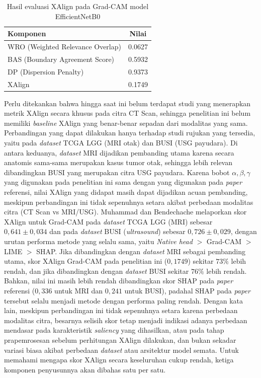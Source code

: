 \begin{table}[htbp]
	\centering
	\caption{Hasil evaluasi XAlign pada Grad-CAM model EfficientNetB0}
	\label{tab:xalign-hasil}
	\begin{tabular}{|l|c|}
		\hline
		\textbf{Komponen} & \textbf{Nilai} \\ \hline
		WRO (Weighted Relevance Overlap) & 0.0627 \\ \hline
		BAS (Boundary Agreement Score)   & 0.5932 \\ \hline
		DP (Dispersion Penalty)          & 0.9373 \\ \hline
		XAlign                  & 0.1749 \\ \hline
	\end{tabular}
\end{table}

Perlu ditekankan bahwa hingga saat ini belum terdapat studi yang menerapkan metrik XAlign secara khusus pada citra CT Scan, sehingga penelitian ini belum memiliki \textit{baseline} XAlign yang benar-benar sepadan dari modalitas yang sama. Perbandingan yang dapat dilakukan hanya terhadap studi rujukan yang tersedia, yaitu pada \textit{dataset} TCGA LGG (MRI otak) dan BUSI (USG payudara). Di antara keduanya, \textit{dataset} MRI dijadikan pembanding utama karena secara anatomis sama-sama merupakan kasus tumor otak, sehingga lebih relevan dibandingkan BUSI yang merupakan citra USG payudara. Karena bobot $\alpha, \beta, \gamma$ yang digunakan pada penelitian ini sama dengan yang digunakan pada \textit{paper} referensi, nilai XAlign yang didapat masih dapat dijadikan acuan pembanding, meskipun perbandingan ini tidak sepenuhnya setara akibat perbedaan modalitas citra (CT Scan vs MRI/USG). Muhammad dan Bendechache \cite{muhammad2025heatmap} melaporkan skor XAlign untuk Grad-CAM pada \textit{dataset} TCGA LGG (MRI) sebesar $0,641 \pm 0,034$ dan pada \textit{dataset} BUSI (\textit{ultrasound}) sebesar $0,726 \pm 0,029$, dengan urutan performa metode yang selalu sama, yaitu \textit{Native head} $>$ Grad-CAM $>$ LIME $>$ SHAP. Jika dibandingkan dengan \textit{dataset} MRI sebagai pembanding utama, skor XAlign Grad-CAM pada penelitian ini ($0,1749$) sekitar $73\%$ lebih rendah, dan jika dibandingkan dengan \textit{dataset} BUSI sekitar $76\%$ lebih rendah. Bahkan, nilai ini masih lebih rendah dibandingkan skor SHAP pada \textit{paper} referensi ($0,336$ untuk MRI dan $0,241$ untuk BUSI), padahal SHAP pada \textit{paper} tersebut selalu menjadi metode dengan performa paling rendah. Dengan kata lain, meskipun perbandingan ini tidak sepenuhnya setara karena perbedaan modalitas citra, besarnya selisih skor tetap menjadi indikasi adanya perbedaan mendasar pada karakteristik \textit{saliency} yang dihasilkan, atau pada tahap prapemrosesan sebelum perhitungan XAlign dilakukan, dan bukan sekadar variasi biasa akibat perbedaan \textit{dataset} atau arsitektur model semata. Untuk memahami mengapa skor XAlign secara keseluruhan cukup rendah, ketiga komponen penyusunnya akan dibahas satu per satu.
